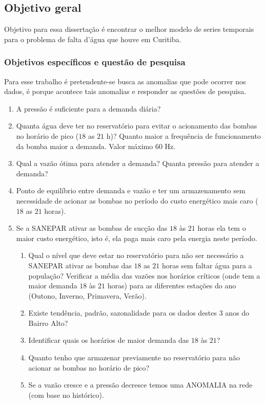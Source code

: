 \subsection{Objetivo geral} \label{subsec:objetivos}

 
Objetivo para essa dissertação é encontrar o melhor modelo de series temporais para o problema de falta d'água que houve em Curitiba.
    
    
    \subsubsection{Objetivos específicos e questão de pesquisa} \label{subsubsec:obespec}
    
Para esse trabalho é pretendente-se busca as anomalias que pode ocorrer nos dados, é porque acontece tais anomalias e responder as questões de pesquisa.

\begin{enumerate}[start=1, label={\textbf{Q} \arabic*}]
	\item \label{q1}  A pressão é suficiente para a demanda diária? 
	\item \label{q2} Quanta água deve ter no reservatório para evitar o acionamento das bombas no horário de pico ($18$ as $21$ h)? Quanto maior a frequência de funcionamento da bomba maior a demanda. Valor máximo $ 60 $ Hz. 
	\item \label{q3} Qual a vazão ótima para atender a demanda? Quanta pressão para atender a demanda? 
	\item \label{q4} Ponto de equilíbrio entre demanda e vazão e ter um armazenamento sem necessidade de acionar as bombas no período do custo energético mais caro ($18$ as $21$ horas).
	\item \label{q5} Se a SANEPAR ativar as bombas de sucção das $18$ às $21$ horas ela tem o maior custo energético, isto é, ela paga mais caro pela energia neste período.
	
	 
	\begin{enumerate}[label=\alph*.]
	\item \label{q5:a} Qual o nível que deve estar no reservatório para não ser necessário a SANEPAR ativar as bombas das $18$ as $21$ horas sem faltar água para a população?
	Verificar a média das vazões nos horários críticos (onde tem a maior demanda $18$ às $21$ horas) para as diferentes estações do ano (Outono, Inverno, Primavera, Verão). 
	\item \label{q5:b} Existe tendência, padrão, sazonalidade para os dados destes 3 anos do Bairro Alto?
	\item \label{q5:c}Identificar quais os horários de maior demanda das $18$ às $21$?
	\item \label{q5:d} Quanto tenho que armazenar previamente no reservatório para não acionar as bombas no horário de pico?
	\item \label{q5:e} Se a vazão cresce e a pressão decresce temos uma ANOMALIA na rede (com base no histórico).	
	\end{enumerate}
\end{enumerate}
